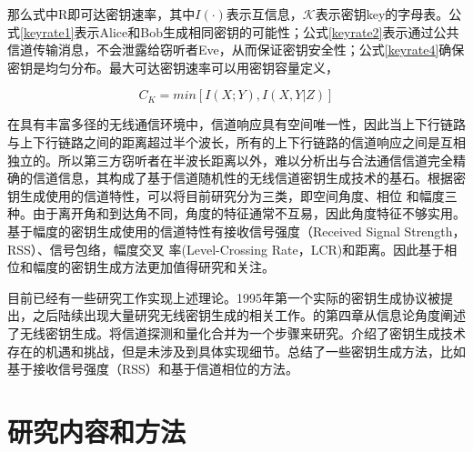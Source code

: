 \documentclass[master]{seuthesis} %
\begin{document}
\begin{Main}
那么式中R即可达密钥速率，其中$I(\cdot)$表示互信息，$\mathcal{K}$表示密钥key的字母表。公式\ref{keyrate1}表示Alice和Bob生成相同密钥的可能性；公式\ref{keyrate2}表示通过公共信道传输消息，不会泄露给窃听者Eve，从而保证密钥安全性；公式\ref{keyrate4}确保密钥是均匀分布。最大可达密钥速率可以用密钥容量定义，

\begin{equation}
    C_K = min[I(X;Y), I(X, Y|Z)]
\end{equation}

在具有丰富多径的无线通信环境中，信道响应具有空间唯一性，因此当上下行链路与上下行链路之间的距离超过半个波长，所有的上下行链路的信道响应之间是互相独立的\cite{jakes1994microwave}。所以第三方窃听者在半波长距离以外，难以分析出与合法通信信道完全精确的信道信息，其构成了基于信道随机性的无线信道密钥生成技术的基石\cite{aono2005wireless, badawy2015secret, koorapaty2000secure, sayeed2008secure, chorti2012helping, shehadeh2012towards, jana2009effectiveness, mathur2008radio, patwari2009high, croft2010robust, liu2014group, azimi2007robust, tope2001unconditionally, liu2014secret, badawy2016robust, zhang2016efficient, xi2014keep, liu2012exploiting, ye2010information, gungor2011secret}。根据密钥生成使用的信道特性，可以将目前研究分为三类，即空间角度\cite{aono2005wireless}\cite{badawy2015secret}、相位
\cite{koorapaty2000secure, sayeed2008secure, chorti2012helping, shehadeh2012towards}和幅度三种。由于离开角和到达角不同，角度的特征通常不互易，因此角度特征不够实用。基于幅度的密钥生成使用的信道特性有接收信号强度（Received Signal Strength，RSS）\cite{jana2009effectiveness, mathur2008radio, patwari2009high, croft2010robust, liu2014group}、信号包络\cite{azimi2007robust, tope2001unconditionally, liu2014secret, badawy2016robust, zhang2016efficient, xi2014keep, liu2012exploiting}，幅度交叉
率(Level-Crossing Rate，LCR)\cite{ye2010information}和距离\cite{gungor2011secret}。因此基于相位和幅度的密钥生成方法更加值得研究和关注。

目前已经有一些研究工作实现上述理论。1995年第一个实际的密钥生成协议被提出\cite{hershey1995unconventional}，之后陆续出现大量研究无线密钥生成的相关工作。\citet{WangSurvey}的第四章从信息论角度阐述了无线密钥生成。\citet{WangSurvey}将信道探测和量化合并为一个步骤来研究。\citet{zeng2015physical}介绍了密钥生成技术存在的机遇和挑战，但是未涉及到具体实现细节。\citet{ren2011secret}总结了一些密钥生成方法，比如基于接收信号强度（RSS）\cite{luo2016rss}和基于信道相位的方法\cite{wang2011fast}。

\section{研究内容和方法}


\end{Main}
\end{document}
